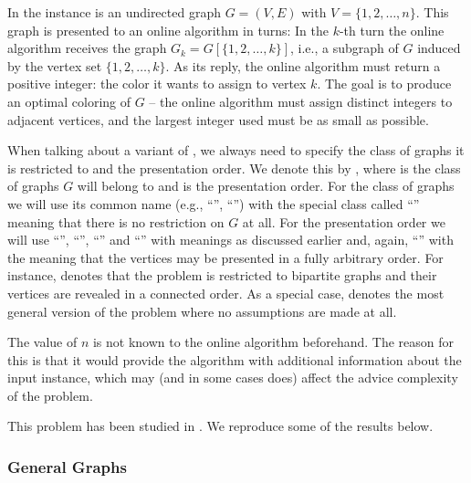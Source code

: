 \begin{definition}\label{def:graph-coloring}
    In  the instance is an undirected graph $G =
    (V, E)$ with $V = \{1, 2, \dots, n\}$. This graph is presented to an
    online algorithm in turns: In the $k$-th turn the online algorithm
    receives the graph $G_k = G[\{1, 2, \dots, k\}]$, i.e., a subgraph of
    $G$ induced by the vertex set $\{1, 2, \dots, k\}$.  As its reply, the
    online algorithm must return a positive integer: the color it wants to
    assign to vertex $k$. The goal is to produce an optimal coloring of
    $G$ -- the online algorithm must assign distinct integers to adjacent
    vertices, and the largest integer used must be as small as possible.
\end{definition}

When talking about a variant of , we always need
to specify the class of graphs it is restricted to and the presentation
order. We denote this by , where  is the class
of graphs $G$ will belong to and  is the presentation order.
For the class of graphs we will use its common name (e.g.,
``'', ``'') with the special class
called ``'' meaning that there is no restriction on $G$ at
all. For the presentation order we will use ``'',
``'', ``'' and ``'' with
meanings as discussed earlier and, again, ``'' with the
meaning that the vertices may be presented in a fully arbitrary order.
For instance,  denotes that the problem is
restricted to bipartite graphs and their vertices are revealed in a
connected order. As a special case,  denotes the most
general version of the problem where no assumptions are made at all.

The value of $n$ is not known to the online algorithm beforehand. The
reason for this is that it would provide the algorithm with additional
information about the input instance, which may (and in some cases does)
affect the advice complexity of the problem.

This problem has been studied in \cite{misof-trivial-graphs, hermi}. We
reproduce some of the results below.

\subsubsection{General Graphs}

